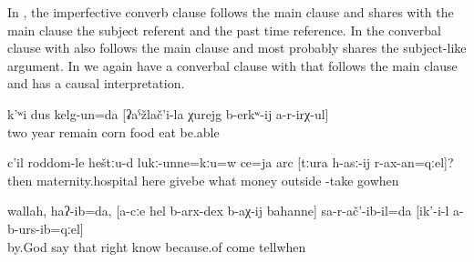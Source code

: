 In , the imperfective converb clause follows the main clause and shares with the main clause the subject referent and the past time reference. In  the converbal clause with  also follows the main clause and most probably shares the subject-like argument. In  we again have a converbal clause with  that follows the main clause and has a causal interpretation.
%
\begin{exe}
	\ex	\label{ex:‎‎‎I remained there for two years, unable to eat food made of corn}
	\gll	k'ʷi	dus	kelg-un=da		[ʡaˁžlač'i-la	χurejg	b-erkʷ-ij	a-r-irχ-ul]\\
		two	year	remain	corn	food	eat	be.able\\
	\glt	{}

	\ex	\label{ex:Then, in the maternity hospital, here you do not give money when you go to take (the child) out (of the hospital and home)}
	\gll	c'il	roddom-le	heštːu-d	lukː-unne=kːu=w	ce=ja	arc	[tːura	h-asː-ij	r-ax-an=qːel]?\\
		then	maternity.hospital	here	givebe	what	money		outside	-take	gowhen\\
	\glt	{}

	\ex	\label{ex:‎‎‎I came to know the truth from you, I said, because he (the other doctor) did not tell me (the truth)}
	\gll	wallah,	haʔ-ib=da,	[a-cːe	hel	b-arx-dex	b-aχ-ij	bahanne]	sa-r-ač'-ib-il=da		[ik'-i-l	a-b-urs-ib=qːel]\\
		by.God	say		that	\tsc{n-}right	know	because.of	come		tellwhen\\
	\glt	{}
\end{exe}

